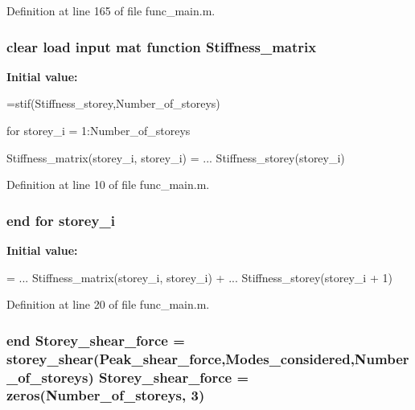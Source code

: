 Definition at line 165 of file func\-\_\-main.\-m.

\subsubsection[{Stiffness\-\_\-matrix}]{ {\bf clear} load input mat {\bf function} Stiffness\-\_\-matrix}\label{func__main_8m_a70c56f90084642dd078d3a85e443f00f}
{\bfseries Initial value\-:}
\begin{DoxyCode}
=stif(Stiffness\_storey,Number\_of\_storeys)



                for  storey_i = 1:Number\_of\_storeys

                        Stiffness_matrix(storey_i, storey\_i) = ...
                        Stiffness\_storey(storey\_i)
\end{DoxyCode}


Definition at line 10 of file func\-\_\-main.\-m.

\subsubsection[{storey\-\_\-i}]{\setlength{\rightskip}{0pt plus 5cm}end for storey\-\_\-i}\label{func__main_8m_a6f92001683fd75ef72b08797cda8d28e}
{\bfseries Initial value\-:}
\begin{DoxyCode}
= ...
                                Stiffness_matrix(storey_i, storey_i) + ...
                                Stiffness\_storey(storey_i + 1)
\end{DoxyCode}


Definition at line 20 of file func\-\_\-main.\-m.

\subsubsection[{Storey\-\_\-shear\-\_\-force}]{\setlength{\rightskip}{0pt plus 5cm}end Storey\-\_\-shear\-\_\-force = storey\-\_\-shear({\bf Peak\-\_\-shear\-\_\-force},Modes\-\_\-considered,Number\-\_\-of\-\_\-storeys) Storey\-\_\-shear\-\_\-force = zeros(Number\-\_\-of\-\_\-storeys, 3)}\label{func__main_8m_a134fef5d3009a6da1f3b70334b85bc3e}


